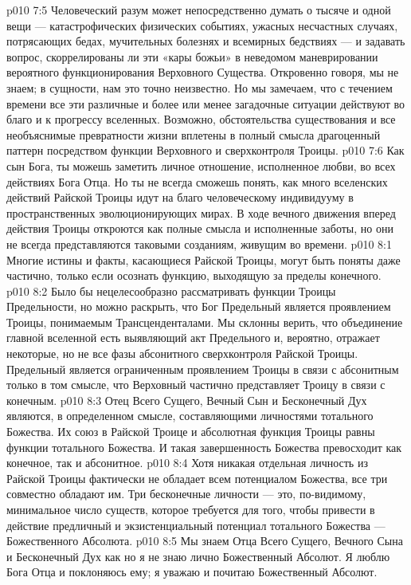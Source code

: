 \vs p010 7:5 Человеческий разум может непосредственно думать о тысяче и одной вещи --- катастрофических физических событиях, ужасных несчастных случаях, потрясающих бедах, мучительных болезнях и всемирных бедствиях --- и задавать вопрос, скоррелированы ли эти «кары божьи» в неведомом маневрировании вероятного функционирования Верховного Существа. Откровенно говоря, мы не знаем; в сущности, нам это точно неизвестно. Но мы замечаем, что с течением времени все эти различные и более или менее загадочные ситуации  действуют во благо и к прогрессу вселенных. Возможно, обстоятельства существования и все необъяснимые превратности жизни вплетены в полный смысла драгоценный паттерн посредством функции Верховного и сверхконтроля Троицы.
\vs p010 7:6 Как сын Бога, ты можешь заметить личное отношение, исполненное любви, во всех действиях Бога Отца. Но ты не всегда сможешь понять, как много вселенских действий Райской Троицы идут на благо человеческому индивидууму в пространственных эволюционирующих мирах. В ходе вечного движения вперед действия Троицы откроются как полные смысла и исполненные заботы, но они не всегда представляются таковыми созданиям, живущим во времени.
\vs p010 8:1 Многие истины и факты, касающиеся Райской Троицы, могут быть поняты даже частично, только если осознать функцию, выходящую за пределы конечного.
\vs p010 8:2 Было бы нецелесообразно рассматривать функции Троицы Предельности, но можно раскрыть, что Бог Предельный является проявлением Троицы, понимаемым Трансценденталами. Мы склонны верить, что объединение главной вселенной есть выявляющий акт Предельного и, вероятно, отражает некоторые, но не все фазы абсонитного сверхконтроля Райской Троицы. Предельный является ограниченным проявлением Троицы в связи с абсонитным только в том смысле, что Верховный частично представляет Троицу в связи с конечным.
\vs p010 8:3 \pc Отец Всего Сущего, Вечный Сын и Бесконечный Дух являются, в определенном смысле, составляющими личностями тотального Божества. Их союз в Райской Троице и абсолютная функция Троицы равны функции тотального Божества. И такая завершенность Божества превосходит как конечное, так и абсонитное.
\vs p010 8:4 Хотя никакая отдельная личность из Райской Троицы фактически не обладает всем потенциалом Божества, все три совместно обладают им. Три бесконечные личности --- это, по\hyp{}видимому, минимальное число существ, которое требуется для того, чтобы привести в действие предличный и экзистенциальный потенциал тотального Божества --- Божественного Абсолюта.
\vs p010 8:5 Мы знаем Отца Всего Сущего, Вечного Сына и Бесконечный Дух как  но я не знаю лично Божественный Абсолют. Я люблю Бога Отца и поклоняюсь ему; я уважаю и почитаю Божественный Абсолют.
